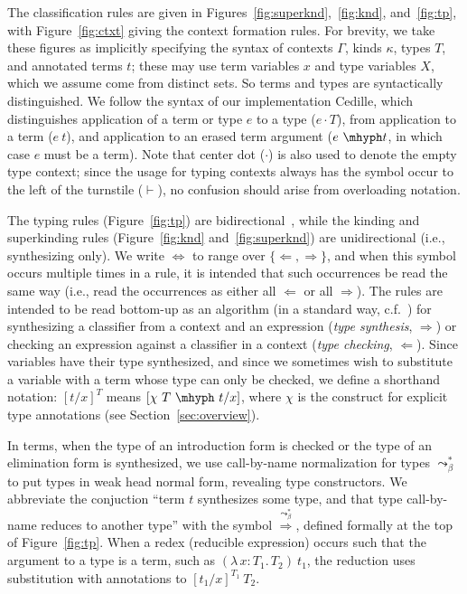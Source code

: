 \documentclass{article}
\newcommand{\abs}[4]{{#1}\, #2\! : \! #3.\, #4}
\newcommand{\tpcheck}[0]{\Leftarrow}
\newcommand{\tpsynth}[0]{\Rightarrow}
\newcommand{\tpsynthleads}[0]{\ensuremath{\overset{\leadsto_\beta^*}{\Rightarrow}}}
\begin{document}
The classification rules are given in
Figures~\ref{fig:superknd},~\ref{fig:knd}, and~\ref{fig:tp}, with
Figure~\ref{fig:ctxt} giving the context formation rules.
For brevity, we take these figures as implicitly specifying the syntax of
contexts \(\Gamma\), kinds $\kappa$, types $T$, and annotated terms $t$; these
may use term variables $x$ and type variables $X$, which we assume come from
distinct sets.  So terms and types are syntactically distinguished.
We follow the syntax of our implementation
Cedille, which distinguishes application of a term or type $e$ to a
type ($e \cdot T$), from application to a term ($e\ t$), and
application to an erased term argument ($e\ \mhyph t$, in which case \(e\) must
be a term).
Note that center dot (\(\cdot\)) is also used to denote the empty type context;
since the usage for typing contexts always has the symbol occur to the left of
the turnstile (\(\vdash\)), no confusion should arise from overloading notation.

The typing rules (Figure~\ref{fig:tp}) are
bidirectional~\cite{pierce+00}, while the kinding and superkinding
rules (Figure~\ref{fig:knd} and~\ref{fig:superknd}) are unidirectional
(i.e., synthesizing only).
We write $\Leftrightarrow$ to range over
$\{\tpcheck,\tpsynth\}$, and when this symbol occurs multiple times in a rule,
it is intended that such occurrences be read the same way (i.e., read the
occurrences as either all \(\tpcheck\) or all \(\tpsynth\)).
The rules are intended to be read bottom-up as an algorithm (in a standard way,
c.f.~\cite{peytonjones07,Pfe01_Lecture-Notes-on-Bidirectional-Type-Checking})
for synthesizing a classifier from a context and an expression (\emph{type
  synthesis}, \(\tpsynth\)) or checking an expression against a classifier in a
context (\emph{type checking}, \(\tpcheck\)).
Since variables have their type synthesized, and since we sometimes wish to
substitute a variable with a term whose type can only be checked, we define a
shorthand notation: \([t/x]^T\) means \([\chi\ T\ \mhyph\ t/x]\), where \(\chi\)
is the construct for explicit type annotations (see Section~\ref{sec:overview}).

In terms, when the type of an introduction form is checked or the type of an
elimination form is synthesized, we use call-by-name normalization for types
\(\leadsto_\beta^*\) to put types in weak head normal form, revealing type
constructors.
We abbreviate the conjuction ``term \(t\) synthesizes some type, and that type
call-by-name reduces to another type'' with the symbol \(\tpsynthleads\),
defined formally at the top of Figure~\ref{fig:tp}.
When a redex (reducible expression) occurs such that the argument to a type is a
term, such as \((\abs{\lambda}{x}{T_1}{T_2})\ t_1\), the reduction uses
substitution with annotations to \([t_1/x]^{T_1}\ T_2\).
\end{document}

